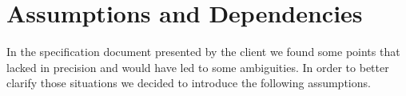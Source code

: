 \section{Assumptions and Dependencies}
In the specification document presented by the client we found some points that lacked in precision and would have led to some ambiguities. In order to better clarify those situations we decided to introduce the following assumptions.

 
   
 




 
 